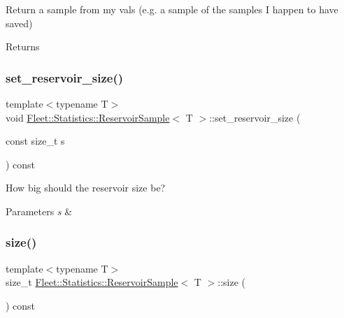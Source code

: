 Return a sample from my vals (e.\+g. a sample of the samples I happen to have saved) \begin{DoxyReturn}{Returns}

\end{DoxyReturn}
\mbox{\label{class_fleet_1_1_statistics_1_1_reservoir_sample_adabe7f40c91657950a67df7d20ace543}} 
\subsubsection{\texorpdfstring{set\+\_\+reservoir\+\_\+size()}{set\_reservoir\_size()}}
{\footnotesize\ttfamily template$<$typename T$>$ \\
void \hyperlink{class_fleet_1_1_statistics_1_1_reservoir_sample}{Fleet\+::\+Statistics\+::\+Reservoir\+Sample}$<$ T $>$\+::set\+\_\+reservoir\+\_\+size (\begin{DoxyParamCaption}\item[{const size\+\_\+t}]{s }\end{DoxyParamCaption}) const\hspace{0.3cm}{\ttfamily [inline]}}

How big should the reservoir size be? 
\begin{DoxyParams}{Parameters}
{\em s} & \\
\hline
\end{DoxyParams}
\mbox{\label{class_fleet_1_1_statistics_1_1_reservoir_sample_abdfad455c8b8da8cb2ab30d0f60053e0}} 
\subsubsection{\texorpdfstring{size()}{size()}}
{\footnotesize\ttfamily template$<$typename T$>$ \\
size\+\_\+t \hyperlink{class_fleet_1_1_statistics_1_1_reservoir_sample}{Fleet\+::\+Statistics\+::\+Reservoir\+Sample}$<$ T $>$\+::size (\begin{DoxyParamCaption}{ }\end{DoxyParamCaption}) const\hspace{0.3cm}{\ttfamily [inline]}}

